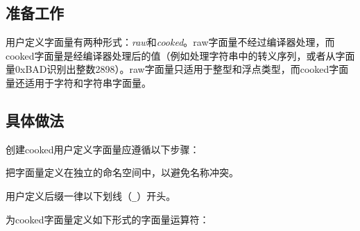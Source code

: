 
\subsection{准备工作}



用户定义字面量有两种形式：\textit{raw}和\textit{cooked}。raw字面量不经过编译器处理，而cooked字面量是经编译器处理后的值（例如处理字符串中的转义序列，或者从字面量0xBAD识别出整数2898）。raw字面量只适用于整型和浮点类型，而cooked字面量还适用于字符和字符串字面量。



\subsection{具体做法}



创建cooked用户定义字面量应遵循以下步骤：



把字面量定义在独立的命名空间中，以避免名称冲突。



用户定义后缀一律以下划线（\texttt{\_}）开头。



为cooked字面量定义如下形式的字面量运算符：



